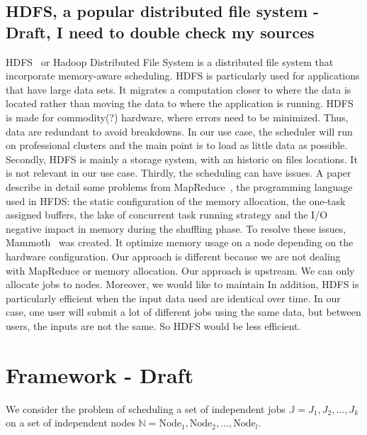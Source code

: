 \documentclass[conference,10pt]{IEEEtran}
\newcommand{\Node}[1]{\ensuremath{\mathrm{Node}_{#1}}\xspace}
\newcommand{\jobset}{\ensuremath{\mathbb{J}}\xspace}
\newcommand{\nodeset}{\ensuremath{\mathbb{N}}\xspace}
\begin{document}
\subsection{HDFS, a popular distributed file system - Draft, I need to double check my sources}
HDFS~\cite{hdfs} or Hadoop Distributed File System is a distributed file system that
incorporate memory-aware scheduling. HDFS is particularly used for applications that have large data sets. 
It migrates a computation closer to where the data is located rather than moving the data to where
the application is running.
HDFS is made for commodity(?) hardware, where errors need to be minimized. Thus, data are redundant
to avoid breakdowns.
In our use case, the scheduler will run on professional clusters and the main point is to load as 
little data as possible. 
Secondly, HDFS is mainly a storage system, with an historic on files locations.
It is not relevant in our use case. 
Thirdly, the scheduling can have issues. A paper describe in detail some problems from MapReduce~\cite{issue_with_hdfs}, the
programming language used in HFDS: the static configuration of the memory allocation, the one-task assigned buffers, the
lake of concurrent task running strategy and the I/O negative impact in memory during the shuffling phase.
To resolve these issues, Mammoth~\cite{Mammoth} was created. It optimize memory usage on a node depending on the hardware configuration.
Our approach is different because we are not dealing with MapReduce or memory allocation.
Our approach is upstream. We can only allocate jobs to nodes. Moreover, we would like to maintain
In addition, HDFS is particularly efficient when the input data used are identical over time.
In our case, one user will submit a lot of different jobs using the same data, but between users,
the inputs are not the same. So HDFS would be less efficient.

\section{Framework - Draft}\label{sec.framework}

We consider the problem of scheduling a set of independent jobs $\jobset = {J_1, J_2, ..., J_k}$ on
a set of independent nodes $\nodeset = {\Node{1}, \Node{2}, ..., \Node{l}}$.
\end{document}
